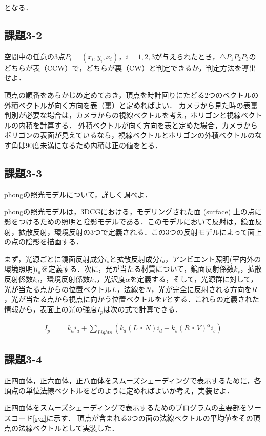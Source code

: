 \documentclass[twocolumn]{jsarticle}
\begin{document}
となる．

\subsection{課題3-2}
空間中の任意の3点$P_i=(x_i,y_i,x_i)，i=1,2,3$が与えられたとき，$\triangle{P_1P_2P_3}$のどちらが表（CCW）で，どちらが裏（CW）と判定できるか，判定方法を導出せよ．

頂点の順番をあらかじめ定めておき，頂点を時計回りにたどる2つのベクトルの外積ベクトルが向く方向を表（裏）と定めればよい．
カメラから見た時の表裏判別が必要な場合は，カメラからの視線ベクトルを考え，ポリゴンと視線ベクトルの内積を計算する．
外積ベクトルが向く方向を表と定めた場合，カメラからポリゴンの表面が見えているなら，視線ベクトルとポリゴンの外積ベクトルのなす角は90度未満になるため内積は正の値をとる．

\subsection{課題3-3}
phongの照光モデルについて，詳しく調べよ．

phongの照光モデルは，3DCGにおける，モデリングされた面 (surface) 上の点に影をつけるための照明と陰影モデルである．このモデルにおいて反射は，鏡面反射，拡散反射，環境反射の3つで定義される．この3つの反射モデルによって面上の点の陰影を描画する．

まず，光源ごとに鏡面反射成分$i_s$と拡散反射成分$i_d$，アンビエント照明(室内外の環境照明)$i_a$を定義する．次に，光が当たる材質について，鏡面反射係数$k_s$，拡散反射係数$k_d$，環境反射係数$k_a$，光沢度$\alpha$を定義する，そして，光源群に対して，光が当たる点からの位置ベクトル$L$，法線を$N$，光が完全に反射される方向を$R$，光が当たる点から視点に向かう位置ベクトルを$V$とする．これらの定義された情報から，表面上の光の強度$I_p$は次の式で計算できる．

\begin{eqnarray}
I_p &=& k_a i_a + \sum_{Lights}(k_d(L・N)i_d + k_s(R・V)^\alpha i_s) \nonumber
\end{eqnarray}


\subsection{課題3-4}
正四面体，正六面体，正八面体をスムーズシェーディングで表示するために，各頂点の単位法線ベクトルをどのように定めればよいか考え，実装せよ．

正四面体をスムーズシェーディングで表示するためのプログラムの主要部をソースコード\ref{sye}に示す．
頂点が含まれる3つの面の法線ベクトルの平均値をその頂点の法線ベクトルとして実装した．
\end{document}
